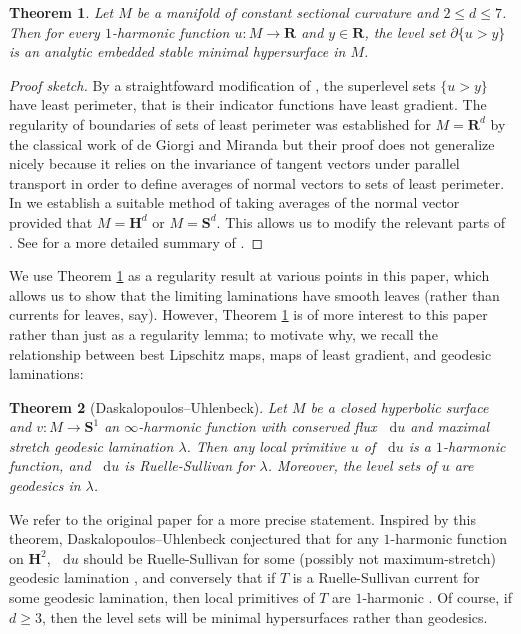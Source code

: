 \documentclass[reqno,11pt]{amsart}
\newcommand{\RR}{\mathbf{R}}
\newcommand{\Hyp}{\mathbf H}
\newcommand{\Sph}{\mathbf S}
\newcommand*\dif{\mathop{}\!\mathrm{d}}
\newtheorem{theorem}{Theorem}[section]
\theoremstyle{definition}
\numberwithin{equation}{section}
\begin{document}
\begin{theorem}\label{main thm of old paper}
Let $M$ be a manifold of constant sectional curvature and $2 \leq d \leq 7$.
Then for every $1$-harmonic function $u: M \to \RR$ and $y \in \RR$, the level set $\partial \{u > y\}$ is an analytic embedded stable minimal hypersurface in $M$.
\end{theorem}
\begin{proof}[Proof sketch]
By a straightfoward modification of \cite[Theorem 1]{BOMBIERI1969}, the superlevel sets $\{u > y\}$ have least perimeter, that is their indicator functions have least gradient.
The regularity of boundaries of sets of least perimeter was established for $M = \RR^d$ by the classical work of de Giorgi and Miranda \cite{deGiorgi61, Miranda66} but their proof does not generalize nicely because it relies on the invariance of tangent vectors under parallel transport in order to define averages of normal vectors to sets of least perimeter.
In \cite[\S3]{BackusFLG} we establish a suitable method of taking averages of the normal vector provided that $M = \Hyp^d$ or $M = \Sph^d$.
This allows us to modify the relevant parts of \cite{Miranda66}.
See \cite[\S1]{BackusFLG} for a more detailed summary of \cite{BackusFLG}.
\end{proof}

We use Theorem \ref{main thm of old paper} as a regularity result at various points in this paper, which allows us to show that the limiting laminations have smooth leaves (rather than currents for leaves, say).
However, Theorem \ref{main thm of old paper} is of more interest to this paper rather than just as a regularity lemma; to motivate why, we recall the  relationship between best Lipschitz maps, maps of least gradient, and geodesic laminations:

\begin{theorem}[Daskalopoulos--Uhlenbeck]\label{DU theorem}
Let $M$ be a closed hyperbolic surface and $v: M \to \Sph^1$ an $\infty$-harmonic function with conserved flux $\dif u$ and maximal stretch geodesic lamination $\lambda$.
Then any local primitive $u$ of $\dif u$ is a $1$-harmonic function, and $\dif u$ is Ruelle-Sullivan for $\lambda$.
Moreover, the level sets of $u$ are geodesics in $\lambda$.
\end{theorem}

We refer to the original paper \cite{daskalopoulos2020transverse} for a more precise statement.
Inspired by this theorem, Daskalopoulos--Uhlenbeck conjectured that for any $1$-harmonic function on $\Hyp^2$, $\dif u$ should be Ruelle-Sullivan for some (possibly not maximum-stretch) geodesic lamination \cite[Problem 9.4]{daskalopoulos2020transverse}, and conversely that if $T$ is a Ruelle-Sullivan current for some geodesic lamination, then local primitives of $T$ are $1$-harmonic \cite[Conjecture 9.5]{daskalopoulos2020transverse}.
Of course, if $d \geq 3$, then the level sets will be minimal hypersurfaces rather than geodesics.
\end{document}
